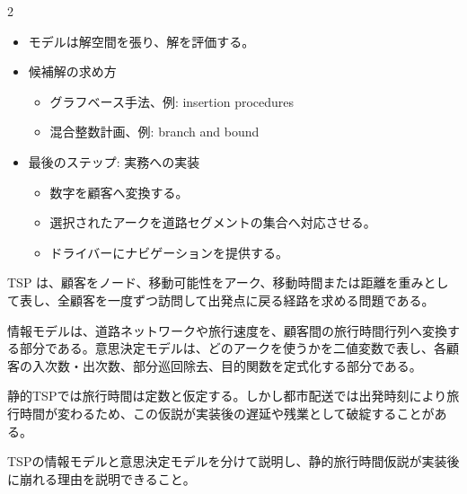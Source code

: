 \clearpage



\vspace{1.5mm}

\begin{multicols}{2}

\footnotesize

\raggedcolumns


\begin{itemize}
\item モデルは解空間を張り、解を評価する。
\item 候補解の求め方
\begin{itemize}
\item グラフベース手法、例: insertion procedures
\item 混合整数計画、例: branch and bound
\end{itemize}
\item 最後のステップ: 実務への実装
\begin{itemize}
\item 数字を顧客へ変換する。
\item 選択されたアークを道路セグメントの集合へ対応させる。
\item ドライバーにナビゲーションを提供する。
\end{itemize}
\end{itemize}

TSP は、顧客をノード、移動可能性をアーク、移動時間または距離を重みとして表し、全顧客を一度ずつ訪問して出発点に戻る経路を求める問題である。\par

情報モデルは、道路ネットワークや旅行速度を、顧客間の旅行時間行列へ変換する部分である。意思決定モデルは、どのアークを使うかを二値変数で表し、各顧客の入次数・出次数、部分巡回除去、目的関数を定式化する部分である。\par

静的TSPでは旅行時間は定数と仮定する。しかし都市配送では出発時刻により旅行時間が変わるため、この仮説が実装後の遅延や残業として破綻することがある。\par

TSPの情報モデルと意思決定モデルを分けて説明し、静的旅行時間仮説が実装後に崩れる理由を説明できること。\par


\end{multicols}

